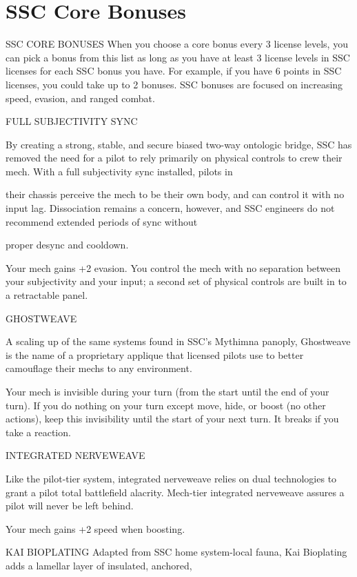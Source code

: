 \section{SSC Core Bonuses}

                                         SSC CORE BONUSES  
When you choose a core bonus every 3 license levels, you can pick a bonus from this list as long  
as you have at least 3 license levels in SSC licenses for each SSC bonus you have. For example,  
if you have 6 points in SSC licenses, you could take up to 2 bonuses. SSC bonuses are focused  
on increasing speed, evasion, and ranged combat.
 

FULL SUBJECTIVITY SYNC  

By creating a strong, stable, and secure biased two-way ontologic bridge, SSC has removed the need for a  
pilot to rely primarily on physical controls to crew their mech. With a full subjectivity sync installed, pilots in  

their chassis perceive the mech to be their own body, and can control it with no input lag. Dissociation  
remains a concern, however, and SSC engineers do not recommend extended periods of sync without  

proper desync and cooldown.   

Your mech gains +2 evasion. You control the mech with no separation between your subjectivity  
and your input; a second set of physical controls are built in to a retractable panel. 
 

GHOSTWEAVE  

A scaling up of the same systems found in SSC’s Mythimna panoply, Ghostweave is the name of a  
proprietary applique that licensed pilots use to better camouflage their mechs to any environment.   

Your mech is invisible during your turn (from the start until the end of your turn). If you do nothing  
on your turn except move, hide, or boost (no other actions), keep this invisibility until the start of  
your next turn. It breaks if you take a reaction.
 

INTEGRATED NERVEWEAVE  

Like the pilot-tier system, integrated nerveweave relies on dual technologies to grant a pilot total battlefield  
alacrity. Mech-tier integrated nerveweave assures a pilot will never be left behind.   

Your mech gains +2 speed when boosting.
 

KAI BIOPLATING  
Adapted from SSC home system-local fauna, Kai Bioplating adds a lamellar layer of insulated, anchored,  

